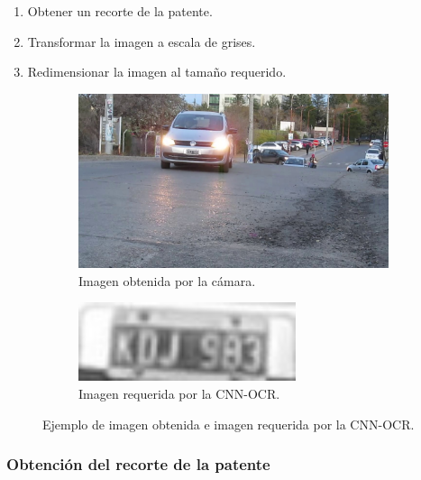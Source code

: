 \begin{enumerate}
    \item Obtener un recorte de la patente.
    \item Transformar la imagen a escala de grises.
    \item Redimensionar la imagen al tamaño requerido.
\end{enumerate}
\begin{figure}[!tbp]
    \centering
    \begin{subfigure}[b]{0.49\textwidth}
        \centering
        \includegraphics[width=\textwidth]{imgs/imagen-obtenida.jpg}
        \caption{Imagen obtenida por la cámara.}
        \label{fig:imagen-obtenida}
    \end{subfigure}
    \hfill
    \begin{subfigure}[b]{0.49\textwidth}
        \centering
        \includegraphics[width=0.7\textwidth]{imgs/imagen-requerida.jpg}
        \caption{Imagen requerida por la CNN-OCR.}
        \label{fig:imagen-requerida}
    \end{subfigure}
    \caption{Ejemplo de imagen obtenida e imagen requerida por la CNN-OCR.}
    \label{fig:Comparativa-imagenes}
\end{figure}

\subsubsection*{Obtención del recorte de la patente}

